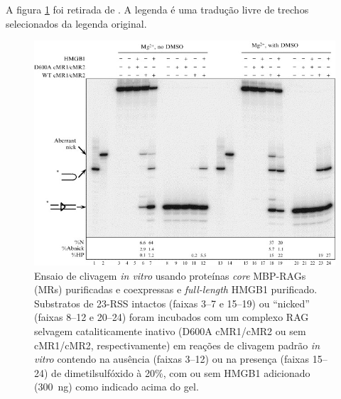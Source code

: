 \documentclass[
	12pt,				%
	openright,			%
	twoside,			%
	a4paper,			%
	]{abntex2}
\begin{document}
A figura \ref{fig:figura} foi retirada de . A legenda é uma tradução livre de trechos selecionados da legenda original.

\begin{figure}
	\centering
	\includegraphics[width=0.7\linewidth]{figura}
	\caption[Ensaio de clivagem.]{Ensaio de clivagem \textit{in vitro} usando proteínas \textit{core} MBP-RAGs (MRs) purificadas e coexpressas e \textit{full-length} HMGB1 purificado. Substratos de 23-RSS intactos (faixas 3–7 e 15–19) ou ``nicked'' (faixas 8–12 e 20–24) foram incubados com um complexo RAG selvagem cataliticamente inativo (D600A cMR1/cMR2 ou sem cMR1/cMR2, respectivamente) em reações de clivagem padrão \textit{in vitro} contendo  na ausência (faixas 3–12) ou na presença (faixas 15–24) de dimetilsulfóxido à 20\%, com ou sem HMGB1 adicionado (\SI{300}{\nano\gram}) como indicado acima do gel. \cite{main}}
	\label{fig:figura}
\end{figure}

\end{document}
